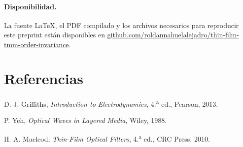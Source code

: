 \documentclass[10pt,a4paper]{article}
\begin{document}
\paragraph{Disponibilidad.}
La fuente \LaTeX{}, el PDF compilado y los archivos necesarios para reproducir este preprint est\'an disponibles en
\href{https://github.com/roldannahuelalejadro/thin-film-tmm-order-invariance}{github.com/roldannahuelalejadro/thin-film-tmm-order-invariance}.

\begin{minipage}{\columnwidth}
\section*{Referencias}
\footnotesize
\begin{enumerate}[label={[\arabic*]},leftmargin=2em,itemsep=0pt,topsep=1pt]
\item D. J. Griffiths, \emph{Introduction to Electrodynamics}, 4.\textsuperscript{a} ed., Pearson, 2013.
\item P. Yeh, \emph{Optical Waves in Layered Media}, Wiley, 1988.
\item H. A. Macleod, \emph{Thin-Film Optical Filters}, 4.\textsuperscript{a} ed., CRC Press, 2010.
\end{enumerate}
\end{minipage}
\end{document}
